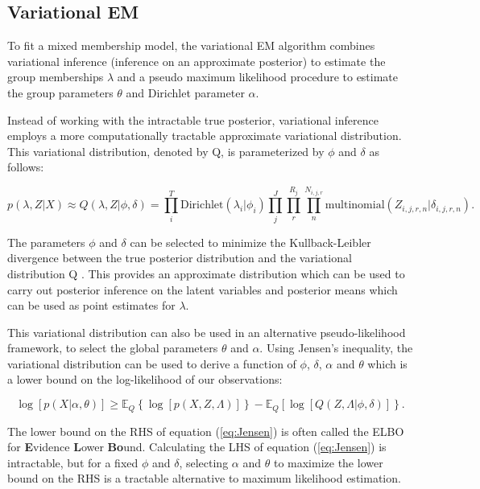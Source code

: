 \documentclass{article}\usepackage[]{graphicx}\usepackage[]{color}
\newcommand{\E}{\mathbb{E}}
\begin{document}
\subsection{Variational EM}\label{VI}
To fit a mixed membership model, the variational EM algorithm combines variational inference (inference on an approximate posterior) to estimate the group memberships $\lambda$ and a pseudo maximum likelihood procedure to estimate the group parameters $\theta$ and Dirichlet parameter $\alpha$.

Instead of working with the intractable true posterior, variational inference employs a more computationally tractable approximate variational distribution. This variational distribution, denoted by Q, is parameterized by $\phi$ and $\delta$ as follows: 

\begin{equation} \label{eq:varDist}
p(\lambda, Z|X) \approx Q(\lambda,Z|\phi, \delta) = \prod_i^T \text{Dirichlet}(\lambda_i|\phi_i)\prod_j^J \prod_r^{R_j} \prod_n^{N_{i,j,r}}\text{multinomial}(Z_{i,j,r,n}|\delta_{i,j,r,n}).
\end{equation}

The parameters $\phi$ and $\delta$ can be selected to minimize the Kullback-Leibler divergence between the true posterior distribution and the variational distribution Q \citep{beal2003variational}. This provides an approximate distribution which can be used to carry out posterior inference on the latent variables and posterior means which can be used as point estimates for $\lambda$.

This variational distribution can also be used in an alternative pseudo-likelihood framework, to select the global parameters $\theta$ and $\alpha$. Using Jensen's inequality, the variational distribution can be used to derive a function of $\phi$, $\delta$, $\alpha$ and $\theta$ which is a lower bound on the log-likelihood of our observations:

\begin{equation}\label{eq:Jensen}
\log\left[p(X|\alpha, \theta)\right] \geq \E_Q\left\{\log\left[p(X,Z, \Lambda)\right]\right\} - \E_Q\left[\log\left[Q(Z, \Lambda|\phi, \delta)\right]\right\}.
\end{equation}

The lower bound on the RHS of equation (\ref{eq:Jensen}) is often called the ELBO for \textbf{E}vidence \textbf{L}ower \textbf{Bo}und. Calculating the LHS of equation (\ref{eq:Jensen}) is intractable, but for a fixed $\phi$ and $\delta$, selecting $\alpha$ and $\theta$ to maximize the lower bound on the RHS is a tractable alternative to maximum likelihood estimation. 
\end{document}
